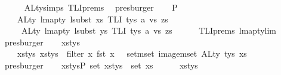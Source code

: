 \begin{isabellebody}
\ \ \ \ \isamarkupfalse%
\ ALty{\isachardot}{\kern0pt}simps{\isacharparenleft}{\kern0pt}{}{\isacharparenright}{\kern0pt}\ TLI{\isachardot}{\kern0pt}prems{\isacharparenleft}{\kern0pt}{}{\isacharparenright}{\kern0pt}\ \isamarkupfalse%
\ presburger\isanewline
\isanewline
\ \ \isamarkupfalse%
\ P{}{}{\isacharcolon}{\kern0pt}\isanewline
\ \ \ \ {\isachardoublequoteopen}ALty\ {\isacharparenleft}{\kern0pt}lmap{\isacharunderscore}{\kern0pt}ty\ {\isacharparenleft}{\kern0pt}lsubst\ xs{\isacharparenright}{\kern0pt}\ {\isacharparenleft}{\kern0pt}TLI\ tys\ a\ vs\ zs{\isacharparenright}{\kern0pt}{\isacharparenright}{\kern0pt}\ {\isacharequal}{\kern0pt}\isanewline
\ \ \ \ \ ALty\ {\isacharparenleft}{\kern0pt}lmap{\isacharunderscore}{\kern0pt}ty\ {\isacharparenleft}{\kern0pt}lsubst\ ys{\isacharparenright}{\kern0pt}\ {\isacharparenleft}{\kern0pt}TLI\ tys\ a\ vs\ zs{\isacharparenright}{\kern0pt}{\isacharparenright}{\kern0pt}{\isachardoublequoteclose}\isanewline
\ \ \ \ \isamarkupfalse%
\ TLI{\isachardot}{\kern0pt}prems{\isacharparenleft}{\kern0pt}{}{\isacharcomma}{\kern0pt}{}{\isacharcomma}{\kern0pt}{}{\isacharcomma}{\kern0pt}{}{\isacharparenright}{\kern0pt}\ lmap{\isacharunderscore}{\kern0pt}ty{\isacharunderscore}{\kern0pt}lim{}\ \isamarkupfalse%
\ presburger\isanewline
\isanewline
\isanewline
\ \ \isamarkupfalse%
\ xs{\isacharunderscore}{\kern0pt}tys\ \isanewline
\ \ \ \ xs{\isacharunderscore}{\kern0pt}tys{\isacharcolon}{\kern0pt}\ {\isachardoublequoteopen}xs{\isacharunderscore}{\kern0pt}tys\ {\isacharequal}{\kern0pt}\ filter\ {\isacharparenleft}{\kern0pt}{\isasymlambda}x{\isachardot}{\kern0pt}\ fst\ x\ {\isasymin}\ {\isasymUnion}\ {\isacharparenleft}{\kern0pt}set{\isacharunderscore}{\kern0pt}mset\ {\isacharparenleft}{\kern0pt}image{\isacharunderscore}{\kern0pt}mset\ ALty\ tys{\isacharparenright}{\kern0pt}{\isacharparenright}{\kern0pt}{\isacharparenright}{\kern0pt}\ xs{\isachardoublequoteclose}\isanewline
\ \ \ \ \isamarkupfalse%
\ presburger\isanewline
\isanewline
\ \ \isamarkupfalse%
\ xs{\isacharunderscore}{\kern0pt}tys{\isacharunderscore}{\kern0pt}P{}{\isacharcolon}{\kern0pt}\ {\isachardoublequoteopen}set\ xs{\isacharunderscore}{\kern0pt}tys\ {\isasymsubseteq}\ set\ xs{\isachardoublequoteclose}\isanewline
\ \ \ \ \isamarkupfalse%
\ xs{\isacharunderscore}{\kern0pt}tys\ \isamarkupfalse%

\end{isabellebody}

